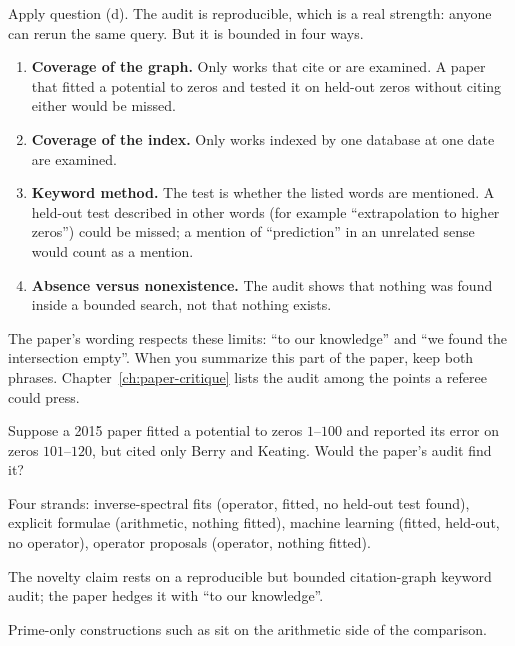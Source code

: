 Apply question (d). The audit is reproducible, which is a real strength: anyone can rerun the same query. But it is bounded in four ways.
\begin{enumerate}
\item \textbf{Coverage of the graph.} Only works that cite \cite{wusprung} or \cite{vanzyl} are examined. A paper that fitted a potential to zeros and tested it on held-out zeros without citing either would be missed.
\item \textbf{Coverage of the index.} Only works indexed by one database at one date are examined.
\item \textbf{Keyword method.} The test is whether the listed words are mentioned. A held-out test described in other words (for example ``extrapolation to higher zeros'') could be missed; a mention of ``prediction'' in an unrelated sense would count as a mention.
\item \textbf{Absence versus nonexistence.} The audit shows that nothing was found inside a bounded search, not that nothing exists.
\end{enumerate}
The paper's wording respects these limits: ``to our knowledge'' and ``we found the intersection empty''. When you summarize this part of the paper, keep both phrases. Chapter~\ref{ch:paper-critique} lists the audit among the points a referee could press.

\begin{checkpoint}
Suppose a 2015 paper fitted a potential to zeros $1$--$100$ and reported its error on zeros $101$--$120$, but cited only Berry and Keating. Would the paper's audit find it?
\end{checkpoint}

\begin{keyideas}
\item Four strands: inverse-spectral fits (operator, fitted, no held-out test found), explicit formulae (arithmetic, nothing fitted), machine learning (fitted, held-out, no operator), operator proposals (operator, nothing fitted).
\item The novelty claim rests on a reproducible but bounded citation-graph keyword audit; the paper hedges it with ``to our knowledge''.
\item Prime-only constructions such as \cite{connes26} sit on the arithmetic side of the comparison.
\end{keyideas}

